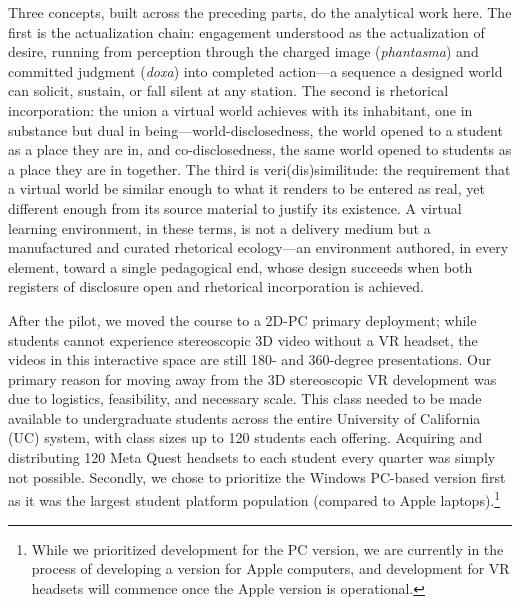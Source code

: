 
Three concepts, built across the preceding parts, do the analytical work here.
The first is the actualization chain: engagement understood as the actualization
of desire, running from perception through the charged image
(\textit{phantasma}) and committed judgment (\textit{doxa}) into completed
action---a sequence a designed world can solicit, sustain, or fall silent
at any station. The second is rhetorical incorporation: the union a virtual world
achieves with its inhabitant, one in substance but dual in
being---world-disclosedness, the world opened to a student as a place they are
in, and co-disclosedness, the same world opened to students as a place they are
in together. The third is veri(dis)similitude: the requirement that a virtual
world be similar enough to what it renders to be entered as real, yet different
enough from its source material to justify its existence. A virtual learning
environment, in these terms, is not a delivery medium but a manufactured and
curated rhetorical ecology---an environment authored, in every element, toward a
single pedagogical end, whose design succeeds when both registers of disclosure
open and rhetorical incorporation is achieved.


After the pilot, we moved the course to a 2D-PC primary
deployment; while students cannot experience stereoscopic 3D video without a VR
headset, the videos in this interactive space are still 180- and 360-degree
presentations. Our primary reason for moving away from the 3D stereoscopic VR
development was due to logistics, feasibility, and necessary scale. This class
needed to be made available to undergraduate students across the entire
University of California (UC) system, with class sizes up to 120 students each
offering. Acquiring and distributing 120 Meta Quest headsets to each student
every quarter was simply not possible. Secondly, we chose to prioritize the
Windows PC-based version first as it was the largest student platform population
(compared to Apple laptops).\footnote{While we prioritized development for the
PC version, we are currently in the process of developing a version for Apple
computers, and development for VR headsets will commence once the Apple version
is operational.}

